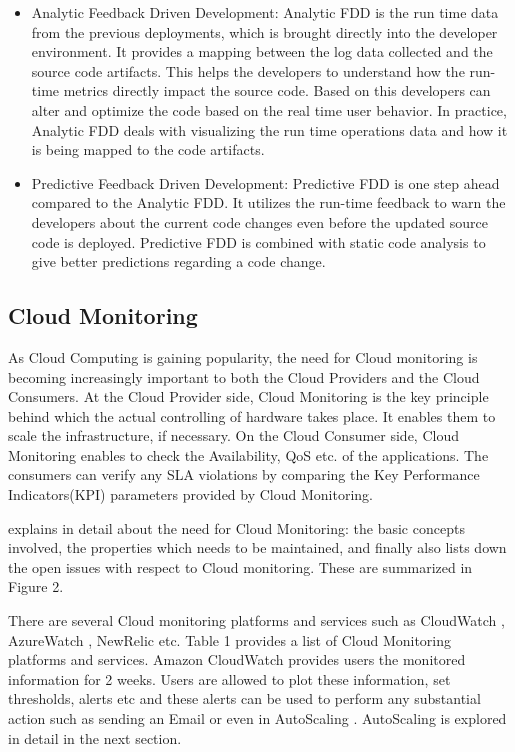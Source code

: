 \documentclass[article,type=msc,colorback,12pt,accentcolor=tud7b]{tudthesis}
\begin{document}
		\begin{itemize}
			\item{Analytic Feedback Driven Development: }
			Analytic FDD is the run time data from the previous deployments, which is brought directly into the developer environment. It provides a mapping between the log data collected and the source code artifacts. This helps the developers to understand how the run-time metrics directly impact the source code. Based on this developers can alter and optimize the code based on the real time user behavior. In practice, Analytic FDD deals with visualizing the run time operations data and how it is being mapped to the code artifacts. 
			
			\item{Predictive Feedback Driven Development: }
			Predictive FDD is one step ahead compared to the Analytic FDD. It utilizes the run-time feedback to warn the developers about the current code changes even before the updated source code is deployed. Predictive FDD is combined with static code analysis to give better predictions regarding a code change. 
		\end{itemize}
	
	\subsection{Cloud Monitoring}
 	
 	As Cloud Computing is gaining popularity, the need for Cloud monitoring is becoming increasingly important to  both the Cloud Providers and the Cloud Consumers. At the Cloud Provider side, Cloud Monitoring is the key principle behind which the actual controlling of hardware takes place. It enables them to scale the infrastructure, if necessary. On the Cloud Consumer side, Cloud Monitoring enables to check the Availability, QoS etc. of the applications. The consumers can verify any SLA violations by comparing the Key Performance Indicators(KPI) parameters provided by Cloud Monitoring.
 	
 	\cite{aceto2013cloud} explains in detail about the need for Cloud Monitoring: the basic concepts involved, the properties which needs to be maintained, and finally also lists down the open issues with respect to Cloud monitoring. These are summarized in Figure 2.
	
	There are several Cloud monitoring platforms and services such as CloudWatch \cite{cloudwatchdev} \cite{cloudwatch}, AzureWatch \cite{azurewatch} , NewRelic \cite{newrelic} etc. Table 1 provides a list of Cloud Monitoring platforms and services. Amazon CloudWatch provides users the monitored information for 2 weeks. Users are allowed to plot these information, set thresholds, alerts etc and these alerts can be used to perform any substantial action such as sending an Email or even in AutoScaling \cite{aas}. AutoScaling is explored in detail in the next section. 
	
\end{document}
